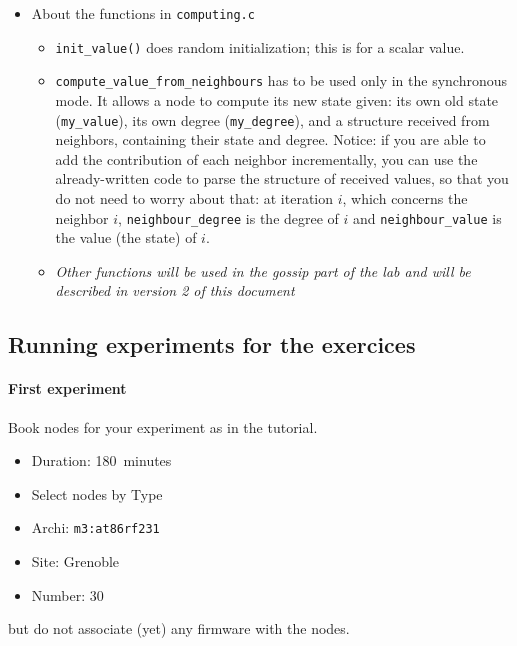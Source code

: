 \documentclass{article}
\begin{document}
\begin{itemize}
\item About the functions in \verb=computing.c=
	\begin{itemize}
	\item  \verb=init_value()= does random initialization; this is for a scalar value.
	\item \verb=compute_value_from_neighbours= has to be used only in the synchronous mode.
        It allows a node to compute its new state given: its own old state (\verb=my_value=),
        its own degree (\verb=my_degree=), and a structure received from neighbors,
        containing their state and degree. Notice: if you are able to add the
        contribution of each neighbor incrementally, you can use the
        already-written code to parse the structure of received values, so that
        you do not need to worry about that: at iteration $i$, which concerns
        the neighbor $i$, \verb=neighbour_degree= is the degree of $i$ and
        \verb=neighbour_value= is the value (the state) of $i$.
	\item \textit{Other functions will be used in the gossip part of the lab and will be described in version 2 of this document}
	\end{itemize}

\end{itemize}

\subsection{Running experiments for the exercices}

\paragraph{First experiment} Book nodes for your experiment as in the tutorial.
\begin{itemize}
\item Duration: 180~minutes
\item Select nodes by Type
\item Archi: \texttt{m3:at86rf231}
\item Site: Grenoble
\item Number: $30$
\end{itemize}
but do not associate (yet) any firmware with the nodes.
\end{document}
